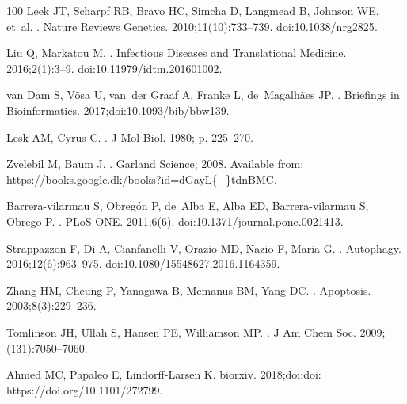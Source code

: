 \documentclass[10pt,letterpaper]{article}
\begin{document}
\begin{thebibliography}{100}
Leek JT, Scharpf RB, Bravo HC, Simcha D, Langmead B, Johnson WE, et~al.
.
\newblock Nature Reviews Genetics. 2010;11(10):733--739.
\newblock doi:{10.1038/nrg2825}.

Liu Q, Markatou M.
.
\newblock Infectious Diseases and Translational Medicine. 2016;2(1):3--9.
\newblock doi:{10.11979/idtm.201601002}.

van Dam S, V{\~{o}}sa U, van~der Graaf A, Franke L, de~Magalh{\~{a}}es JP.
.
\newblock Briefings in Bioinformatics. 2017;doi:{10.1093/bib/bbw139}.

Lesk AM, Cyrus C.
.
\newblock J Mol Biol. 1980; p. 225--270.

Zvelebil M, Baum J.
.
\newblock Garland Science; 2008.
\newblock Available from:
  \url{https://books.google.dk/books?id=dGayL{\_}tdnBMC}.

Barrera-vilarmau S, Obreg{\'{o}}n P, de~Alba E, Alba ED, Barrera-vilarmau S,
  Obrego P.
.
\newblock PLoS ONE. 2011;6(6).
\newblock doi:{10.1371/journal.pone.0021413}.

Strappazzon F, Di A, Cianfanelli V, Orazio MD, Nazio F, Maria G.
.
\newblock Autophagy. 2016;12(6):963--975.
\newblock doi:{10.1080/15548627.2016.1164359}.

Zhang HM, Cheung P, Yanagawa B, Mcmanus BM, Yang DC.
.
\newblock Apoptosis. 2003;8(3):229--236.

Tomlinson JH, Ullah S, Hansen PE, Williamson MP.
.
\newblock J Am Chem Soc. 2009;(131):7050--7060.

Ahmed MC, Papaleo E, Lindorff-Larsen K.
\newblock biorxiv. 2018;doi:{doi: https://doi.org/10.1101/272799}.


\end{thebibliography}
\end{document}
